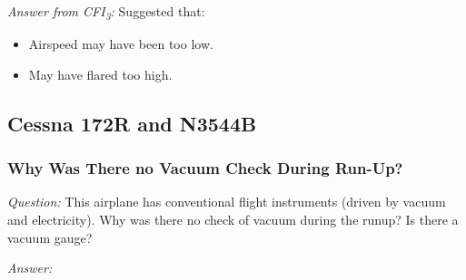 \documentclass[letterpaper,10pt,titlepage]{article}
\begin{document}
\noindent{}\emph{Answer from CFI\textsubscript{3}:}  Suggested that:
\begin{itemize}
\item Airspeed may have been too low.
\item May have flared too high.
\end{itemize}


\subsection{Cessna 172R and N3544B}
\label{sqsa0:sc7r0}


\subsubsection{Why Was There no Vacuum Check During Run-Up?}
\label{sqsa0:sc7r0:slhy0}

\emph{Question:} This airplane has conventional flight instruments (driven by
vacuum and electricity).  Why was there no check of vacuum during the runup?  Is
there a vacuum gauge?

\noindent{}\emph{Answer:}


\end{document}
